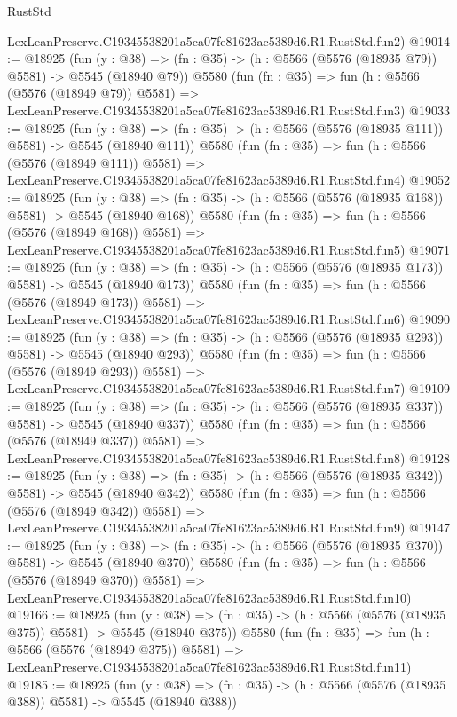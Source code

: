 \begin{lexlean}{RustStd}
\begin{coremodule}
    LexLeanPreserve.C19345538201a5ca07fe81623ac5389d6.R1.RustStd.fun2)
@19014 := @18925
    (fun (y : @38) => (fn : @35) -> (h : @5566 (@5576 (@18935 @79)) @5581) -> @5545 (@18940 @79))
    @5580
    (fun (fn : @35) =>
    fun (h : @5566 (@5576 (@18949 @79)) @5581) =>
    LexLeanPreserve.C19345538201a5ca07fe81623ac5389d6.R1.RustStd.fun3)
@19033 := @18925
    (fun (y : @38) => (fn : @35) -> (h : @5566 (@5576 (@18935 @111)) @5581) -> @5545 (@18940 @111))
    @5580
    (fun (fn : @35) =>
    fun (h : @5566 (@5576 (@18949 @111)) @5581) =>
    LexLeanPreserve.C19345538201a5ca07fe81623ac5389d6.R1.RustStd.fun4)
@19052 := @18925
    (fun (y : @38) => (fn : @35) -> (h : @5566 (@5576 (@18935 @168)) @5581) -> @5545 (@18940 @168))
    @5580
    (fun (fn : @35) =>
    fun (h : @5566 (@5576 (@18949 @168)) @5581) =>
    LexLeanPreserve.C19345538201a5ca07fe81623ac5389d6.R1.RustStd.fun5)
@19071 := @18925
    (fun (y : @38) => (fn : @35) -> (h : @5566 (@5576 (@18935 @173)) @5581) -> @5545 (@18940 @173))
    @5580
    (fun (fn : @35) =>
    fun (h : @5566 (@5576 (@18949 @173)) @5581) =>
    LexLeanPreserve.C19345538201a5ca07fe81623ac5389d6.R1.RustStd.fun6)
@19090 := @18925
    (fun (y : @38) => (fn : @35) -> (h : @5566 (@5576 (@18935 @293)) @5581) -> @5545 (@18940 @293))
    @5580
    (fun (fn : @35) =>
    fun (h : @5566 (@5576 (@18949 @293)) @5581) =>
    LexLeanPreserve.C19345538201a5ca07fe81623ac5389d6.R1.RustStd.fun7)
@19109 := @18925
    (fun (y : @38) => (fn : @35) -> (h : @5566 (@5576 (@18935 @337)) @5581) -> @5545 (@18940 @337))
    @5580
    (fun (fn : @35) =>
    fun (h : @5566 (@5576 (@18949 @337)) @5581) =>
    LexLeanPreserve.C19345538201a5ca07fe81623ac5389d6.R1.RustStd.fun8)
@19128 := @18925
    (fun (y : @38) => (fn : @35) -> (h : @5566 (@5576 (@18935 @342)) @5581) -> @5545 (@18940 @342))
    @5580
    (fun (fn : @35) =>
    fun (h : @5566 (@5576 (@18949 @342)) @5581) =>
    LexLeanPreserve.C19345538201a5ca07fe81623ac5389d6.R1.RustStd.fun9)
@19147 := @18925
    (fun (y : @38) => (fn : @35) -> (h : @5566 (@5576 (@18935 @370)) @5581) -> @5545 (@18940 @370))
    @5580
    (fun (fn : @35) =>
    fun (h : @5566 (@5576 (@18949 @370)) @5581) =>
    LexLeanPreserve.C19345538201a5ca07fe81623ac5389d6.R1.RustStd.fun10)
@19166 := @18925
    (fun (y : @38) => (fn : @35) -> (h : @5566 (@5576 (@18935 @375)) @5581) -> @5545 (@18940 @375))
    @5580
    (fun (fn : @35) =>
    fun (h : @5566 (@5576 (@18949 @375)) @5581) =>
    LexLeanPreserve.C19345538201a5ca07fe81623ac5389d6.R1.RustStd.fun11)
@19185 := @18925
    (fun (y : @38) => (fn : @35) -> (h : @5566 (@5576 (@18935 @388)) @5581) -> @5545 (@18940 @388))

\end{coremodule}
\end{lexlean}

